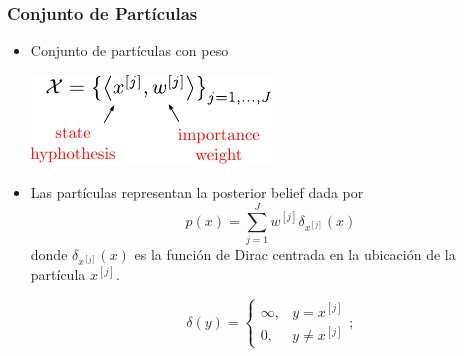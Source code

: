 \begin{frame}
    \frametitle{Conjunto de Partículas}
    
    \begin{itemize}
        \item Conjunto de partículas con peso
            
        \begin{center}
            \includegraphics[width=0.5\columnwidth]{./images/particle_filter/weighted_samples.pdf}
        \end{center}

        \item Las partículas representan la posterior belief dada por
        \begin{equation*}
            p(x) = \sum_{j=1}^{J} w^{[j]} \delta_{x^{[j]}}(x)    
        \end{equation*}
        donde $\delta_{x^{[j]}}(x)$ es la función de Dirac centrada en la ubicación de la partícula $x^{[j]}$.

        \begin{equation*}
            \delta(y) = 
            \begin{cases} 
            \infty, & y = x^{[j]} \\ 
            0, & y \neq x^{[j]} 
            \end{cases};    
        \end{equation*}



    \end{itemize}
   
\end{frame}


